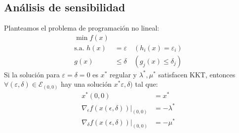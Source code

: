 \documentclass[leqno]{article}
\begin{document}
\subsection{Análisis de sensibilidad}
Planteamos el problema de programación no lineal:
\begin{align*}
  \min f(x) & \\
  \text{s.a.  } h(x) &= \varepsilon \quad (h_i(x) = \varepsilon_i) \\
  g(x) &\le \delta \quad (g_j(x)\le  \delta_j)
\end{align*}
Si la solución para $\varepsilon = \delta = 0$ es  $x^*$ regular y  $\lambda^*, \mu^*$ satisfacen KKT, entonces $\forall (\varepsilon, \delta) \in \mathcal{E}_{(0, 0)}$ hay una solución $x^*\varepsilon, \delta)$ tal que:
\begin{align*}
  x^*(0, 0) &= x^* \\
  \nabla _\epsilon f(x(\epsilon, \delta))|_{(0, 0)} &= -\lambda^* \\
  \nabla _\delta f(x(\epsilon, \delta))|_{(0,0)} &= -\mu^*
\end{align*}
\end{document}
